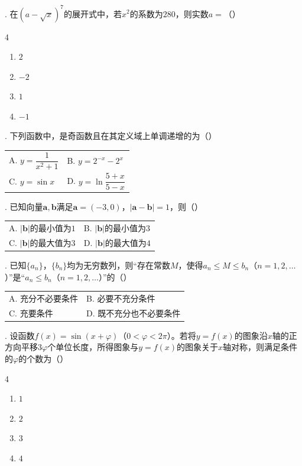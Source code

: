 . 在$(a-\sqrt{x})^7$的展开式中，若$x^2$的系数为$280$，则实数$a=$（\quad）
\begin{multicols}{4}
\begin{enumerate}[label=\Alph*.,leftmargin=*]
  \item $2$
  \item $-2$
  \item $1$
  \item $-1$
\end{enumerate}
\end{multicols}

. 下列函数中，是奇函数且在其定义域上单调递增的为（\quad）
\begin{center}
\begin{tabular}{@{}p{}p{}@{}}
A. $y=\dfrac{1}{x^2+1}$ & B. $y=2^{-x}-2^x$ \\
C. $y=\sin x$ & D. $y=\ln\dfrac{5+x}{5-x}$
\end{tabular}
\end{center}

. 已知向量$\boldsymbol a,\boldsymbol b$满足$\boldsymbol a=(-3,0)$，$|\boldsymbol a-\boldsymbol b|=1$，则（\quad）
\begin{center}
\begin{tabular}{@{}p{}p{}@{}}
A. $|\boldsymbol b|$的最小值为$1$ & B. $|\boldsymbol b|$的最小值为$3$ \\
C. $|\boldsymbol b|$的最大值为$3$ & D. $|\boldsymbol b|$的最大值为$4$
\end{tabular}
\end{center}

. 已知$\{a_n\}$，$\{b_n\}$均为无穷数列，则“存在常数$M$，使得$a_n\leqslant M\leqslant b_n$（$n=1,2,\ldots$）”是“$a_n\leqslant b_n$（$n=1,2,\ldots$）”的（\quad）
\begin{center}
\begin{tabular}{@{}p{}p{}@{}}
A. 充分不必要条件 & B. 必要不充分条件 \\
C. 充要条件 & D. 既不充分也不必要条件
\end{tabular}
\end{center}

. 设函数$f(x)=\sin(x+\varphi)$（$0<\varphi<2\pi$）。若将$y=f(x)$的图象沿$x$轴的正方向平移$3\varphi$个单位长度，所得图象与$y=f(x)$的图象关于$x$轴对称，则满足条件的$\varphi$的个数为（\quad）
\begin{multicols}{4}
\begin{enumerate}[label=\Alph*.,leftmargin=*]
  \item $1$
  \item $2$
  \item $3$
  \item $4$
\end{enumerate}
\end{multicols}

